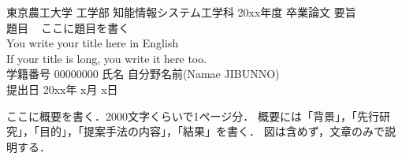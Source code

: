 \begin{center}
{\normalsize 東京農工大学 工学部 知能情報システム工学科 20xx年度 卒業論文 要旨}\\
{\normalsize 題目 \ }
{\large ここに題目を書く}\\
{\normalsize You write your title here in English}\\
{\normalsize If your title is long, you write it here too.}\\
{\normalsize 学籍番号 00000000 \hspace{20pt}}
{\normalsize 氏名 自分野名前(Namae JIBUNNO)}\\
{\normalsize 提出日 20xx年 x月 x日}\\
\end{center}

ここに概要を書く．2000文字くらいで1ページ分．
概要には「背景」，「先行研究」，「目的」，「提案手法の内容」，「結果」を書く．
図は含めず，文章のみで説明する．

\restoregeometry